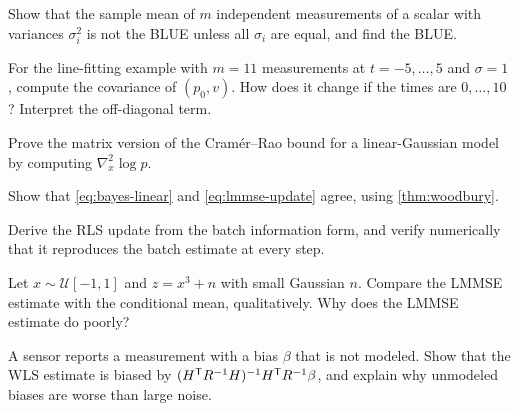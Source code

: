 \begin{exercises}
  \item Show that the sample mean of $m$ independent measurements of a scalar with variances $\sigma_i^2$ is not the BLUE unless all $\sigma_i$ are equal,
        and find the BLUE.
  \item For the line-fitting example with $m = 11$ measurements at $t = -5, \dots, 5$ and $\sigma = 1$, compute the covariance of $(p_0, v)$. How does it change
        if the times are $0, \dots, 10$? Interpret the off-diagonal term.
  \item Prove the matrix version of the Cram\'er--Rao bound for a linear-Gaussian model by computing $\nabla^2_x\log p$.
  \item Show that \eqref{eq:bayes-linear} and \eqref{eq:lmmse-update} agree, using \cref{thm:woodbury}.
  \item Derive the RLS update from the batch information form, and verify numerically that it reproduces the batch estimate at every step.
  \item Let $x \sim \mathcal U[-1, 1]$ and $z = x^3 + n$ with small Gaussian $n$. Compare the LMMSE estimate with the conditional mean, qualitatively. Why does
        the LMMSE estimate do poorly?
  \item A sensor reports a measurement with a bias $\beta$ that is not modeled. Show that the WLS estimate is biased by $(H^{\mathsf{T}} R^{-1} H)^{-1} H^{\mathsf{T}} R^{-1}\beta$, and explain
        why unmodeled biases are worse than large noise.
\end{exercises}

